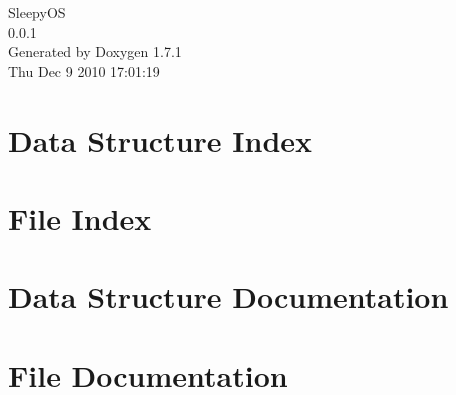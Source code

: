 \documentclass[a4paper]{book}
\begin{document}
\hypersetup{pageanchor=false}
\begin{titlepage}
\vspace*{7cm}
\begin{center}
{\Large SleepyOS \\[1ex]\large 0.0.1 }\\
\vspace*{1cm}
{\large Generated by Doxygen 1.7.1}\\
\vspace*{0.5cm}
{\small Thu Dec 9 2010 17:01:19}\\
\end{center}
\end{titlepage}
\clearemptydoublepage
{}
\tableofcontents
\clearemptydoublepage
{}
\hypersetup{pageanchor=true}
\chapter{Data Structure Index}

\chapter{File Index}

\chapter{Data Structure Documentation}



















\chapter{File Documentation}




























\printindex
\end{document}
